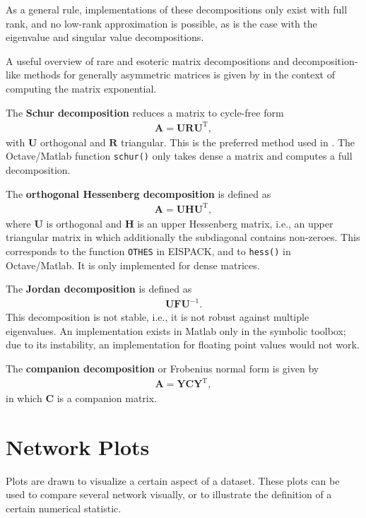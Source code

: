 \documentclass{article}
\begin{document}
As a general rule, implementations of these decompositions only exist
with full rank, and no low-rank approximation is possible, as is the
case with the eigenvalue and singular value decompositions. 

A useful overview of rare and esoteric matrix decompositions and
decomposition-like methods for generally asymmetric matrices is given by
\cite{b136} in the context of computing the matrix exponential. 

The \textbf{Schur decomposition}
 reduces a matrix to cycle-free form
\begin{align}
  \mathbf A = \mathbf U \mathbf R \mathbf U^{\mathrm T},
\end{align}
with $\mathbf U$ orthogonal and $\mathbf R$ triangular.  
This is the preferred method used in \citep{b136}. 
The Octave/Matlab function \texttt{schur()} only takes dense a matrix and
computes a full decomposition. 

The \textbf{orthogonal Hessenberg decomposition} \citep{b139} is defined
as
\begin{align}
  \mathbf A = \mathbf U \mathbf H \mathbf U^{\mathrm T},
\end{align}
where $\mathbf U$ is orthogonal and $\mathbf H$ is an upper Hessenberg
matrix, i.e., an upper triangular matrix in which additionally the
subdiagonal contains non-zeroes.  This corresponds to the function
\texttt{OTHES} in EISPACK, and to \texttt{hess()} in Octave/Matlab.  It
is only implemented for dense matrices. 

The \textbf{Jordan decomposition} is defined as
\begin{align}
  \textbf{U} \textbf{F} \textbf{U}^{-1}.
\end{align}
This decomposition is not stable, i.e., it is not robust against
multiple eigenvalues. 
An implementation exists in Matlab only in the symbolic toolbox; due to its
instability, an implementation for floating point values would not
work. 

The \textbf{companion decomposition} or Frobenius normal form
\citep[p.\ 19]{b136} is given by
\begin{align}
  \mathbf A = \mathbf Y \mathbf C \mathbf Y^{\mathrm T},
\end{align} 
in which $\mathbf C$ is a companion matrix.

\section{Network Plots}
\label{sec:plots}
Plots are drawn to visualize a certain aspect of a dataset. These plots
can be used to compare several network visually, or to illustrate the
definition of a certain numerical statistic.
\end{document}
